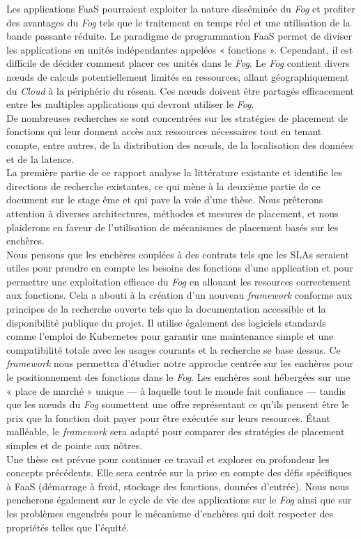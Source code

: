 Les applications \gls{FaaS} pourraient exploiter la nature disséminée du \emph{Fog} et profiter des avantages du \emph{Fog} tels que le traitement en temps réel et une utilisation de la bande passante réduite. Le paradigme de programmation \gls{FaaS} permet de diviser les applications en unités indépendantes appelées « fonctions ». Cependant, il est difficile de décider comment placer ces unités dans le \emph{Fog}. Le \emph{Fog} contient divers nœuds de calculs potentiellement limités en ressources, allant géographiquement du \emph{Cloud} à la périphérie du réseau. Ces nœuds doivent être partagés efficacement entre les multiples applications qui devront utiliser le \emph{Fog}.\\
De nombreuses recherches se sont concentrées sur les stratégies de placement de fonctions qui leur donnent accès aux ressources nécessaires tout en tenant compte, entre autres, de la distribution des nœuds, de la localisation des données et de la latence.\\
La première partie de ce rapport analyse la littérature existante et identifie les directions de recherche existantes, ce qui mène à la deuxième partie de ce document sur le stage ême et qui pave la voie d'une thèse. Nous prêterons attention à diverses architectures, méthodes et mesures de placement, et nous plaiderons en faveur de l'utilisation de mécanismes de placement basés sur les enchères.\\
Nous pensons que les enchères couplées à des contrats tels que les \glspl{SLA} seraient utiles pour prendre en compte les besoins des fonctions d'une application et pour permettre une exploitation efficace du \emph{Fog} en allouant les resources correctement aux fonctions.
Cela a abouti à la création d'un nouveau \emph{framework} conforme aux principes de la recherche ouverte tels que la documentation accessible et la disponibilité publique du projet. Il utilise également des logiciels standards comme l'emploi de Kubernetes pour garantir une maintenance simple et une compatibilité totale avec les usages courants et la recherche se base dessus. Ce \emph{framework} nous permettra d'étudier notre approche centrée sur les enchères pour le positionnement des fonctions dans le \emph{Fog}. Les enchères sont hébergées sur une « place de marché » unique — à laquelle tout le monde fait confiance — tandis que les nœuds du \emph{Fog} soumettent une offre représentant ce qu'ils pensent être le prix que la fonction doit payer pour être exécutée sur leurs resources. Étant malléable, le \emph{framework} sera adapté pour comparer des stratégies de placement simples et de pointe aux nôtres.\\
Une thèse est prévue pour continuer ce travail et explorer en profondeur les concepts précédents. Elle sera centrée sur la prise en compte des défis spécifiques à \gls{FaaS} (démarrage à froid, stockage des fonctions, données d'entrée). Nous nous pencherons également sur le cycle de vie des applications sur le \emph{Fog} ainsi que sur les problèmes engendrés pour le mécanisme d'enchères qui doit respecter des propriétés telles que l'équité.

